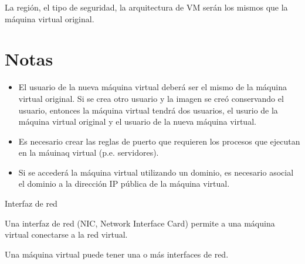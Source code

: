 
La región, el tipo de seguridad, la arquitectura de VM serán los mismos que la máquina virtual original.

\section{Notas}

\begin{itemize}
\item El usuario de la nueva máquina virtual deberá ser el mismo de la máquina virtual original. Si se crea otro usuario y la imagen se creó conservando el usuario, entonces la máquina virtual tendrá dos usuarios, el usurio de la máquina virtual original y el usuario de la nueva máquina virtual.
\item Es necesario crear las reglas de puerto que requieren los procesos que ejecutan en la máuinaq virtual (p.e. servidores).
\item Si se accederá la máquina virtual utilizando un dominio, es necesario asocial el dominio a la dirección IP pública de la máquina virtual.
\end{itemize}

\clearpage


Interfaz de red

Una interfaz de red (NIC, Network Interface Card) permite a una máquina virtual conectarse a la red virtual.

Una máquina virtual puede tener una o más interfaces de red.

